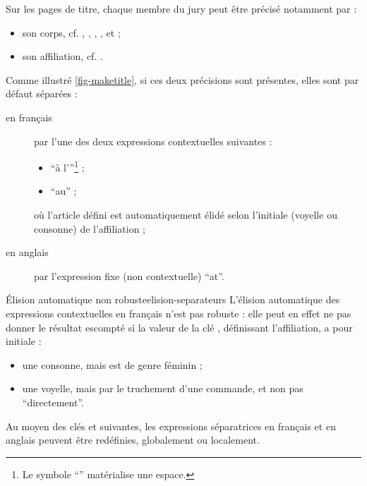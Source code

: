 Sur les pages de titre, chaque membre du jury peut être précisé notamment par :
\begin{itemize}
\item son corps, cf. , , ,
  ,  et
   ;
\item son affiliation, cf. .
\end{itemize}
Comme illustré \vref{fig-maketitle}, si ces deux précisions sont présentes,
elles sont par défaut séparées :
\begin{description}
\item[en français] par l'une des deux expressions contextuelles suivantes :
  \begin{itemize}
  \item \enquote{\textvisiblespace{}à l'}\footnote{Le symbole
      \enquote{\textvisiblespace{}} matérialise une espace.} ;
  \item \enquote{\textvisiblespace{}au\textvisiblespace{}} ;
  \end{itemize}
  où l'article défini est automatiquement élidé selon l'initiale (voyelle ou
  consonne) de l'affiliation ;
\item[en anglais] par l'expression fixe (non contextuelle)
  \enquote{\textvisiblespace{}at\textvisiblespace{}}.
\end{description}

\begin{dbwarning}{Élision automatique non robuste}{elision-separateurs}
  L'élision automatique des expressions contextuelles en français n'est pas
  robuste : elle peut en effet ne pas donner le résultat escompté si la valeur
  de la clé , définissant l'affiliation, a pour initiale :
  \begin{itemize}
  \item une consonne, mais est de genre féminin ;
  \item une voyelle, mais par le truchement d'une commande\commandeacronyme, et
    non pas \enquote{directement}.
  \end{itemize}
\end{dbwarning}

Au moyen des clés  et 
suivantes, les expressions séparatrices en français et en anglais peuvent être
redéfinies, globalement ou localement.

